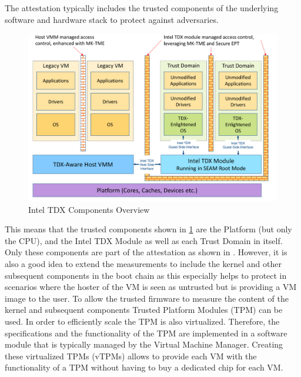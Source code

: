\documentclass[sigplan,screen,nonacm]{acmart}
\begin{document}
The attestation typically includes the trusted components of the underlying software and hardware stack to protect against adversaries.
\begin{figure}
  \centering
  \includegraphics[width=\linewidth]{pictures/TDX_Arch.png}
  \caption{Intel TDX Components Overview \cite{Intel-TDX-Module-Specs}}
  \label{fig:tdxcomponents}
\end{figure}

This means that the trusted components shown in \cref{fig:tdxcomponents} are the Platform (but only the CPU), and the Intel TDX Module as well as each Trust Domain in itself.
Only these components are part of the attestation as shown in \cite{CA-KVM}.
However, it is also a good idea to extend the measurements to include the kernel and other subsequent components in the boot chain as this especially helps to protect in scenarios where the hoster of the VM is seen as untrusted but is providing a VM image to the user.
To allow the trusted firmware to measure the content of the kernel and subsequent components Trusted Platform Modules (TPM) can be used.
In order to efficiently scale the TPM is also virtualized.
Therefore, the specifications and the functionality of the TPM are implemented in a software module that is typically managed by the Virtual Machine Manager.
Creating these virtualized TPMs (vTPMs) allows to provide each VM with the functionality of a TPM without having to buy a dedicated chip for each VM.
\end{document}
